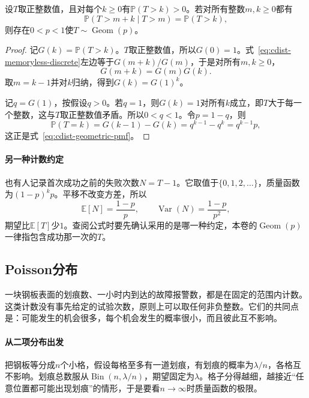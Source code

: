 \begin{theorem}[几何分布的无记忆刻画]
\label{thm:cdist-geometric-memoryless}
设$T$取正整数值，且对每个$k\geq0$有$\mathbb{P}(T>k)>0$。若对所有整数$m,k\geq0$都有
\begin{equation}
  \mathbb{P}(T>m+k\mid T>m)=\mathbb{P}(T>k),
  \label{eq:cdist-memoryless-discrete}
\end{equation}
则存在$0<p<1$使$T\sim\operatorname{Geom}(p)$。
\end{theorem}

\begin{proof}
记$G(k)=\mathbb{P}(T>k)$。$T$取正整数值，所以$G(0)=1$。式~\eqref{eq:cdist-memoryless-discrete}左边等于$G(m+k)/G(m)$，于是对所有$m,k\geq0$，
\[
  G(m+k)=G(m)G(k).
\]
取$m=k-1$并对$k$归纳，得到$G(k)=G(1)^{k}$。

记$q=G(1)$，按假设$q>0$。若$q=1$，则$G(k)=1$对所有$k$成立，即$T$大于每一个整数，这与$T$取正整数值矛盾。所以$0<q<1$。令$p=1-q$，则
\[
  \mathbb{P}(T=k)=G(k-1)-G(k)=q^{k-1}-q^{k}=q^{k-1}p,
\]
这正是式~\eqref{eq:cdist-geometric-pmf}。
\end{proof}

\paragraph{另一种计数约定}
也有人记录首次成功之前的失败次数$N=T-1$。它取值于$\{0,1,2,\dots\}$，质量函数为$(1-p)^{k}p$。平移不改变方差，所以
\[
  \mathbb{E}[N]=\frac{1-p}{p},\qquad \operatorname{Var}(N)=\frac{1-p}{p^{2}},
\]
期望比$\mathbb{E}[T]$少$1$。查阅公式时要先确认采用的是哪一种约定，本卷的$\operatorname{Geom}(p)$一律指包含成功那一次的$T$。

\subsection{Poisson分布}
\label{sec:cdist-poisson}

一块钢板表面的划痕数、一小时内到达的故障报警数，都是在固定的范围内计数。这类计数没有事先给定的试验次数，原则上可以取任何非负整数。它们的共同点是：可能发生的机会很多，每个机会发生的概率很小，而且彼此互不影响。

\paragraph{从二项分布出发}
把钢板等分成$n$个小格，假设每格至多有一道划痕，有划痕的概率为$\lambda/n$，各格互不影响。划痕总数服从$\operatorname{Bin}(n,\lambda/n)$，期望固定为$\lambda$。格子分得越细，越接近“任意位置都可能出现划痕”的情形，于是要看$n\to\infty$时质量函数的极限。

